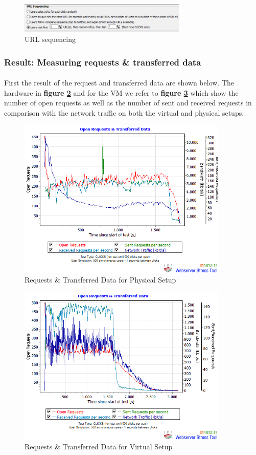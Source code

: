  \begin{figure}[H]
    \centering
    \includegraphics[width=8cm]{Pictures/pto03.PNG}
    \caption{URL sequencing}
    \label{fig:pto3}
\end{figure}
\clearpage
\subsubsection{Result: Measuring requests \& transferred data}
\paragraph{}
First the result of the request and transferred data are shown below. The hardware in \textbf{figure \ref{fig:resP1hw}}  and for the VM we refer to \textbf{figure \ref{fig:resP1vm}} which show the number of open requests as well as the number of sent and received requests in comparison with the network traffic on both the virtual and physical setups.

 \begin{figure}[H]
    \centering
    \includegraphics[width=10cm]{Pictures/graph6hw.png}
    \caption{Requests \& Transferred Data for Physical Setup}
    \label{fig:resP1hw}
\end{figure}

\begin{figure}[H]
    \centering
    \includegraphics[width=10cm]{Pictures/graph6vm.png}
    \caption{Requests \& Transferred Data for Virtual Setup}
    \label{fig:resP1vm}
\end{figure}

